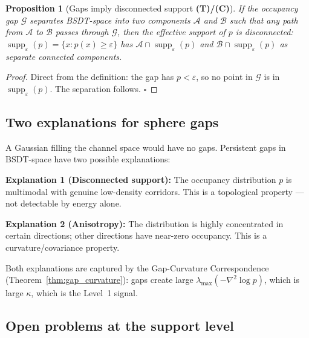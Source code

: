 \documentclass[11pt,a4paper]{article}
\newtheorem{proposition}[theorem]{Proposition}
\theoremstyle{definition}
\begin{document}
\begin{proposition}[Gaps imply disconnected support \textbf{(T)/(C)}]
If the occupancy gap $\mathcal{G}$ separates BSDT-space into two components
$\mathcal{A}$ and $\mathcal{B}$ such that any path from $\mathcal{A}$ to $\mathcal{B}$
passes through $\mathcal{G}$, then the effective support of $p$ is disconnected:
$\operatorname{supp}_\varepsilon(p) = \{x : p(x) \geq \varepsilon\}$ has
$\mathcal{A}\cap\operatorname{supp}_\varepsilon(p)$ and
$\mathcal{B}\cap\operatorname{supp}_\varepsilon(p)$ as separate connected components.
\end{proposition}

\begin{proof}
Direct from the definition: the gap has $p < \varepsilon$, so no point in $\mathcal{G}$
is in $\operatorname{supp}_\varepsilon(p)$. The separation follows. $\square$
\end{proof}

\subsection{Two explanations for sphere gaps}

A Gaussian filling the channel space would have no gaps.
Persistent gaps in BSDT-space have two possible explanations:

\textbf{Explanation 1 (Disconnected support):}
The occupancy distribution $p$ is multimodal with genuine low-density corridors.
This is a topological property --- not detectable by energy alone.

\textbf{Explanation 2 (Anisotropy):}
The distribution is highly concentrated in certain directions;
other directions have near-zero occupancy.
This is a curvature/covariance property.

Both explanations are captured by the Gap-Curvature Correspondence
(Theorem~\ref{thm:gap_curvature}):
gaps create large $\lambda_\text{max}(-\nabla^2\log p)$,
which is large $\kappa$,
which is the Level~1 signal.

\subsection{Open problems at the support level}
\end{document}
